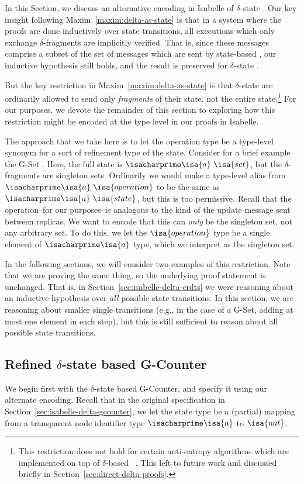 In this Section, we discuss an alternative encoding in Isabelle of
$\delta$-state \CRDTs. Our key insight following
Maxim~\ref{maxim:delta-as-state} is that in a system where the proofs are done
inductively over state transitions, all executions which only exchange
$\delta$-fragments are implicitly verified. That is, since these messages
comprise a subset of the set of messages which are sent by state-based \CRDTs,
our inductive hypothesis still holds, and the result is preserved for
$\delta$-state \CRDTs.

But the key restriction in Maxim~\ref{maxim:delta-as-state} is that
$\delta$-state \CRDTs are ordinarily allowed to send only \emph{fragments} of
their state, not the entire state.\footnote{This restriction does not hold for
certain anti-entropy algorithms which are implemented on top of $\delta$-based
\CRDTs~\citep{almedia18}. This left to future work and discussed briefly in
Section~\ref{sec:direct-delta-proofs}.} For our purposes, we devote the
remainder of this section to exploring how this restriction might be encoded at
the type level in our proofs in Isabelle.

The approach that we take here is to let the operation type be a type-level
synonym for a sort of refinement type of the state. Consider for a brief example
the G-Set \CRDT. Here, the full state is $\isacharprime\isa{a}~\isa{set}$, but
the $\delta$-fragments are singleton sets. Ordinarily we would make a type-level
alias from $\isacharprime\isa{a}~\isa{operation}$ to be the same as
$\isacharprime\isa{a}~\isa{state}$, but this is too permissive. Recall that the
operation--for our purposes--is analogous to the kind of the update message sent
between replicas. We want to encode that this can \emph{only} be the singleton
set, not any arbitrary set. To do this, we let the $\isa{operation}$ type be a
single element of $\isacharprime\isa{a}$ type, which we interpret as the
singleton set.

In the following sections, we will consider two examples of this restriction.
Note that we are proving the same thing, so the underlying proof statement is
unchanged. That is, in Section~\ref{sec:isabelle-delta-crdts} we were reasoning
about an inductive hypothesis over \emph{all} possible state transitions. In
this section, we are reasoning about smaller single transitions (e.g., in the
case of a G-Set, adding at most one element in each step), but this is still
sufficient to reason about all possible state transitions.

\subsection{Refined $\delta$-state based G-Counter}
We begin first with the $\delta$-state based G-Counter, and specify it using our
alternate encoding. Recall that in the original specification in
Section~\ref{sec:isabelle-delta-gcounter}, we let the state type be a (partial)
mapping from a transparent node identifier type $\isacharprime\isa{a}$ to
$\isa{nat}$.

